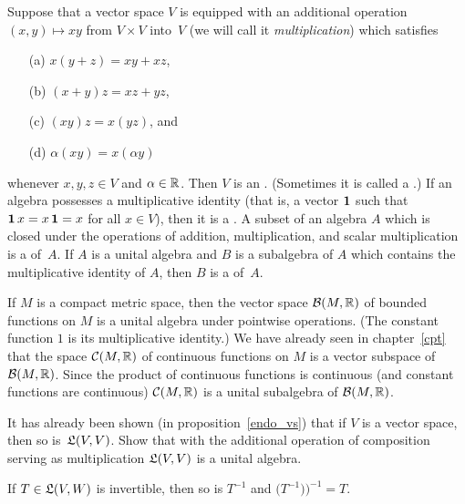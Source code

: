 \begin{defn}\label{def_alg} Suppose that a vector space $V$ is equipped with an additional operation
$(x,y) \mapsto xy$ from $V \times V$ into~$V$ (we will call it \emph{multiplication}) which
satisfies
 \begin{enumerate}
  \item[(a)] $x(y + z) = xy + xz$,
  \item[(b)] $(x + y)z = xz + yz$,
  \item[(c)] $(xy)z = x(yz)$, and
  \item[(d)] $\alpha(xy) = x(\alpha  y)$
 \end{enumerate}
whenever  $x,y,z \in V$ and $\alpha \in \mathbb{R}$.  Then $V$ is an
.  (Sometimes it is called a .)  If an algebra
possesses a multiplicative identity (that is, a vector $\mathbf{1}$ such that $\mathbf{1}\,x = x\,\mathbf{1}
= x$ for all $x \in V$), then it is a
.  A subset of an algebra $A$ which is closed under the operations of
addition, multiplication, and scalar multiplication is a
 of~$A$.  If $A$ is a unital algebra and $B$ is a subalgebra of $A$ which
contains the multiplicative identity of $A$, then $B$ is a
 of~$A$.
\end{defn}

\begin{exam}\label{exam_cont_alg} If $M$ is a compact metric space, then the vector space
$\mathcal{B}(M,\mathbb{R})$ of bounded functions on $M$ is a unital algebra under pointwise operations.
(The constant function $1$ is its multiplicative identity.)  We have already seen in
chapter~\ref{cpt} that the space $\mathcal{C}(M,\mathbb{R})$ of continuous functions on $M$ is a vector
subspace of $\mathcal{B}(M,\mathbb{R})$. Since the product of continuous functions is continuous (and
constant functions are continuous) $\mathcal{C}(M,\mathbb{R})$ is a unital subalgebra of $\mathcal{B}(M,\mathbb{R})$.
\end{exam}

\begin{prob}\label{prob_lt_alg} It has already been shown (in proposition~\ref{endo_vs}) that
if $V$ is a vector space, then so is~$\mathfrak{L}(V,V)$.  Show that with the additional operation
of composition serving as multiplication $\mathfrak{L}(V,V)$ is a unital algebra.
\end{prob}

\begin{prob} If $T \in \mathfrak{L}(V,W)$ is invertible, then so is $T^{-1}$ and
$\bigl(T^{-1})\bigr)^{-1} = T$.
\end{prob}


